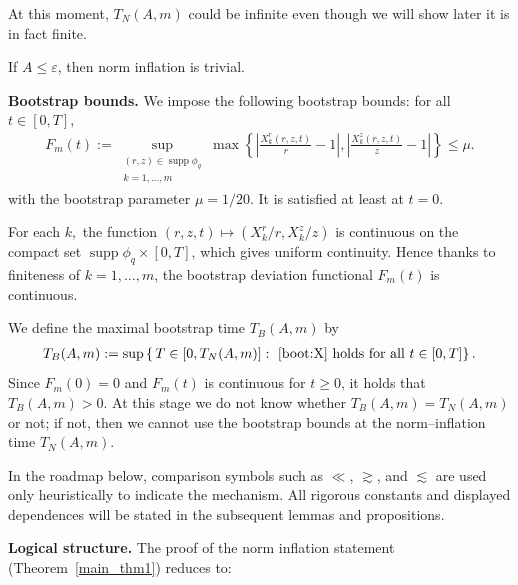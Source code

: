 \documentclass[reqno,11pt]{amsart}
\newcommand{\supp}{\operatorname{supp}}
\begin{document}
At this moment, $T_N(A,m)$ could be infinite even though we will show later it is in fact finite.

If $A\leq\varepsilon$, then norm inflation is trivial. 


\medskip
\noindent\textbf{Bootstrap bounds.}
We impose the following bootstrap bounds: for all $t\in [0,T],$ 
\begin{align}
    \label{boot:X}
    F_m(t):=
    \sup_{\substack{(r,z)\in \supp \phi_q\\ k=1,\ldots,m}}
    \max\left\{
    \left| \frac{X_k^r(r,z,t)}{r}-1\right|,
    \left|\frac{X_k^z(r,z,t)}{z}-1\right|
    \right\} \leq \mu.
\end{align}
with the bootstrap parameter $\mu=1/20.$ It is satisfied at least at $t=0$.

For each $k,$ the function $(r,z,t)\mapsto (X_k^r/r,X_k^z/z)$ is continuous on the compact set $\supp \phi_q \times [0,T]$, which gives uniform continuity. Hence thanks to finiteness of $k=1,\ldots,m$, the bootstrap deviation functional $F_m(t)$ is continuous.

We define the maximal bootstrap time $T_B(A,m)$ by
\begin{align}
\label{def_TB_Euler}
T_B(A, m)
:=\sup\left\{
\,T\in[0,T_N(A,m)]:
\ \eqref{boot:X} \text{ holds for all }t\in[0,T]
\right\} .
\end{align}
Since $F_m(0)=0$ and $F_m(t)$ is continuous for  $t\geq 0$,  it holds that $T_B(A,m)>0$.
At this stage we do not know whether $T_B(A,m)=T_N(A,m)$ or not; if not, then we cannot use the bootstrap bounds at the norm--inflation time $T_N(A,m)$.

In the roadmap below, comparison symbols such as $\ll$, $\gtrsim$, and $\lesssim$ are used only heuristically to indicate the mechanism. 
All rigorous constants and displayed dependences will be stated in the subsequent lemmas and propositions.



\medskip
\noindent\textbf{Logical structure.}
The proof of the norm inflation statement (Theorem~\ref{main_thm1}) reduces to:
\end{document}
